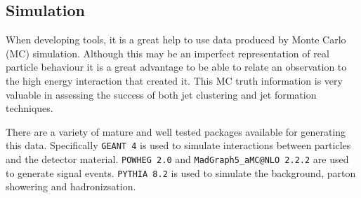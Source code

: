 \subsection{Simulation}

When developing tools, it is a great help to use data produced by Monte Carlo (MC) simulation.
Although this may be an imperfect representation of real particle behaviour 
it is a great advantage to be able to relate an observation to the high energy interaction that created it.
This MC truth information is very valuable in assessing the success of both jet clustering and 
jet formation techniques.

There are a variety of mature and well tested packages available for generating this data.
Specifically \lstinline{GEANT 4} \cite{agostinelli_geant4simulation2003} is used to simulate interactions between particles and the detector material.
\lstinline{POWHEG 2.0} \cite{alioli_powheg2010} and \lstinline{MadGraph5_aMC@NLO 2.2.2} \cite{alwall_madgraph2011} are used to generate signal events.
\lstinline{PYTHIA 8.2} \cite{sjostrand_pythia2015} is used to simulate the background, parton showering and hadronizsation.

